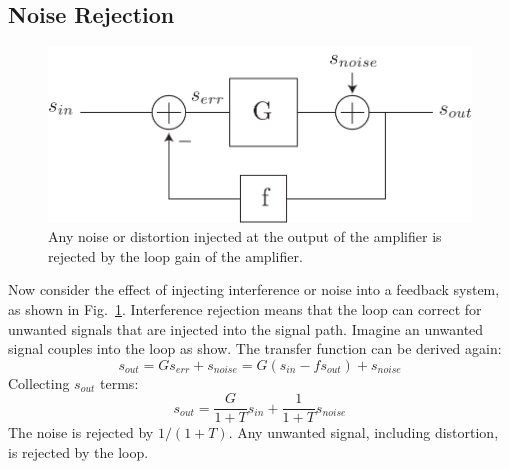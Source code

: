\subsection{Noise Rejection}
\begin{figure}[tb]
\centering
\includegraphics[scale=.7]{fbblock_noise}
\caption{Any noise or distortion injected at the output of the amplifier is rejected by the loop gain of the amplifier.}
\label{fig:fbblock_noise}
\end{figure}
Now consider the effect of injecting interference or noise into a feedback system, as shown in Fig.~\ref{fig:fbblock_noise}. Interference rejection means that the loop can correct for unwanted signals that are injected into the signal path.  Imagine an unwanted signal couples into the loop as show.  The transfer function can be derived again:
    \begin{equation}
        {s_{out}} = G{s_{err}} + {s_{noise}} = G({s_{in}} - f{s_{out}}) + {s_{noise}}
    \end{equation}
Collecting $s_{out}$ terms:
    \begin{equation}
        {s_{out}} = \frac{G}{{1 + T}}{s_{in}} + \frac{1}{{1 + T}}{s_{noise}}
    \end{equation}
The noise is rejected by $1/(1+T)$. Any unwanted signal, including distortion, is rejected by the loop.
